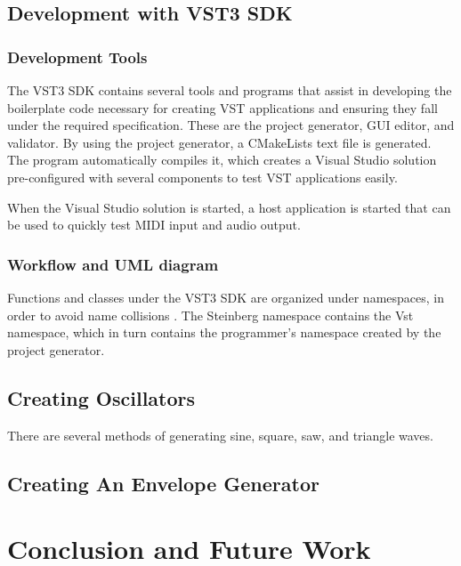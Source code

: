 \documentclass[12pt]{article}
\begin{document}
\subsection{Development with VST3 SDK}


\subsubsection{Development Tools}
The VST3 SDK contains several tools and programs that assist in developing the boilerplate code necessary for creating VST applications and ensuring they fall under the required specification. These are the project generator, GUI editor, and validator. By using the project generator, a CMakeLists text file is generated. The program automatically compiles it, which creates a Visual Studio solution pre-configured with several components to test VST applications easily. 

When the Visual Studio solution is started, a host application is started that can be used to quickly test MIDI input and audio output.

\subsubsection{Workflow and UML diagram}
Functions and classes under the VST3 SDK are organized under namespaces, in order to avoid name collisions \cite{Pirkle_2015}. The Steinberg namespace contains the Vst namespace, which in turn contains the programmer's namespace created by the project generator. 

\subsection{Creating Oscillators}
There are several methods of generating sine, square, saw, and triangle waves. 

\subsection{Creating An Envelope Generator}

\newpage
\section{Conclusion and Future Work}

\newpage


\end{document}
